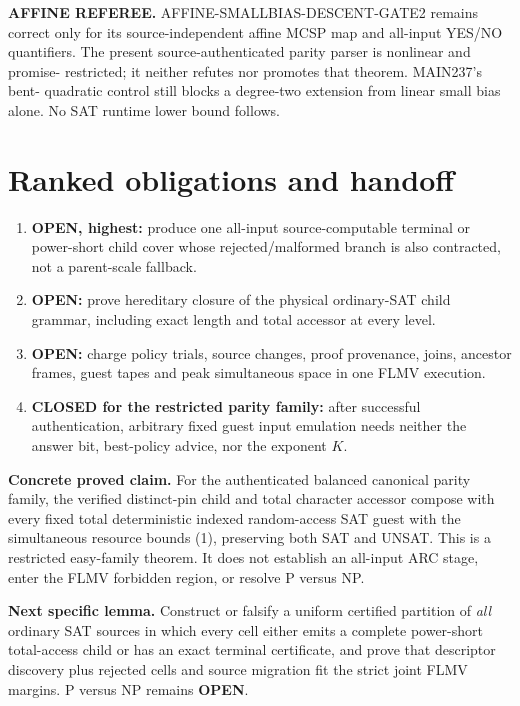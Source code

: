\documentclass[11pt]{article}
\begin{document}
\textbf{AFFINE REFEREE.}  AFFINE-SMALLBIAS-DESCENT-GATE2 remains correct only
for its source-independent affine MCSP map and all-input YES/NO quantifiers.
The present source-authenticated parity parser is nonlinear and promise-
restricted; it neither refutes nor promotes that theorem.  MAIN237's bent-
quadratic control still blocks a degree-two extension from linear small bias
alone.  No SAT runtime lower bound follows.

\section{Ranked obligations and handoff}
\begin{enumerate}
\item \textbf{OPEN, highest:} produce one all-input source-computable terminal
or power-short child cover whose rejected/malformed branch is also contracted,
not a parent-scale fallback.
\item \textbf{OPEN:} prove hereditary closure of the physical ordinary-SAT
child grammar, including exact length and total accessor at every level.
\item \textbf{OPEN:} charge policy trials, source changes, proof provenance,
joins, ancestor frames, guest tapes and peak simultaneous space in one FLMV
execution.
\item \textbf{CLOSED for the restricted parity family:} after successful
authentication, arbitrary fixed guest input emulation needs neither the answer
bit, best-policy advice, nor the exponent $K$.
\end{enumerate}

\textbf{Concrete proved claim.}  For the authenticated balanced canonical
parity family, the verified distinct-pin child and total character accessor
compose with every fixed total deterministic indexed random-access SAT guest
with the simultaneous resource bounds (1), preserving both SAT and UNSAT.
This is a restricted easy-family theorem.  It does not establish an all-input
ARC stage, enter the FLMV forbidden region, or resolve P versus NP.

\textbf{Next specific lemma.}  Construct or falsify a uniform certified
partition of \emph{all} ordinary SAT sources in which every cell either emits
a complete power-short total-access child or has an exact terminal certificate,
and prove that descriptor discovery plus rejected cells and source migration
fit the strict joint FLMV margins.  P versus NP remains \textbf{OPEN}.
\end{document}
